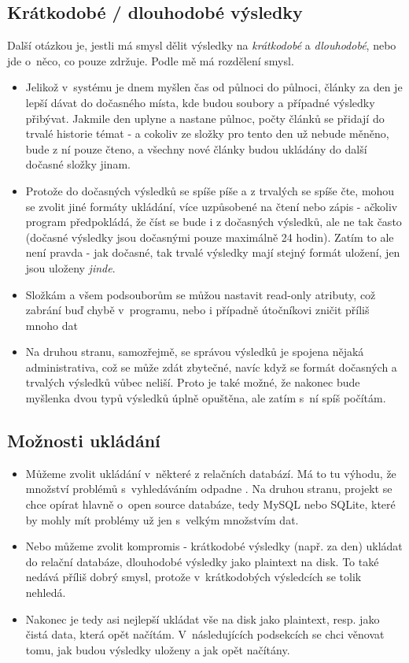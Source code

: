 \documentclass[12pt]{amsart}
\begin{document}
\subsection{Krátkodobé / dlouhodobé výsledky}
Další otázkou je, jestli má smysl dělit výsledky na \emph{krátkodobé} a \emph{dlouhodobé}, nebo jde o~něco, co pouze zdržuje. Podle mě má rozdělení smysl.
\begin{itemize}
    \item Jelikož v~systému je dnem myšlen čas od půlnoci do půlnoci, články za  den je lepší dávat do dočasného místa, kde budou soubory a případné výsledky přibývat. Jakmile den uplyne a nastane půlnoc, počty článků se přidají do trvalé historie témat - a cokoliv ze složky pro tento den už nebude měněno, bude z ní pouze čteno, a všechny nové články budou ukládány do další dočasné složky jinam.
    \item Protože do dočasných výsledků se spíše píše a z trvalých se spíše čte, mohou se zvolit jiné formáty ukládání, více uzpůsobené na čtení nebo zápis - ačkoliv program předpokládá, že číst se bude i z dočasných výsledků, ale ne tak často (dočasné výsledky jsou dočasnými pouze maximálně 24 hodin). Zatím to ale není pravda - jak dočasné, tak trvalé výsledky mají stejný formát uložení, jen jsou uloženy \emph{jinde}.
    \item Složkám a všem podsouborům se můžou nastavit read-only atributy, což zabrání buď chybě v~programu, nebo i případně útočníkovi zničit příliš mnoho dat
    \item Na druhou stranu, samozřejmě, se správou výsledků je spojena nějaká administrativa, což se může zdát zbytečné, navíc když se formát dočasných a trvalých výsledků vůbec neliší. Proto je také možné, že nakonec bude myšlenka dvou typů výsledků úplně opuštěna, ale zatím s~ní spíš počítám.
\end{itemize}

\subsection{Možnosti ukládání}
\begin{itemize}
    \item Můžeme zvolit ukládání v~některé z relačních databází. Má to tu výhodu, že množství problémů s~vyhledáváním odpadne . Na druhou stranu, projekt se chce opírat hlavně o~open source databáze, tedy MySQL nebo SQLite, které by mohly mít problémy už jen s~velkým množstvím dat.
    \item Nebo můžeme zvolit kompromis - krátkodobé výsledky (např. za den) ukládat do relační databáze, dlouhodobé výsledky jako plaintext na disk. To také nedává příliš dobrý smysl, protože v~krátkodobých výsledcích se tolik nehledá.
    \item Nakonec je tedy asi nejlepší ukládat vše na disk jako plaintext, resp. jako čistá data, která opět načítám. V~následujících podsekcích se chci věnovat tomu, jak budou výsledky uloženy a jak opět načítány.
\end{itemize}
\end{document}
